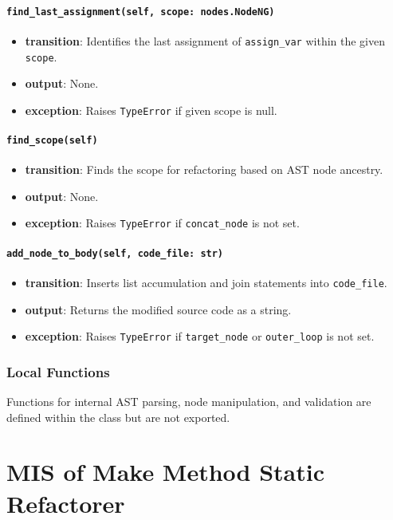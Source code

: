 \documentclass[12pt, titlepage]{article}
\begin{document}
\paragraph{\texttt{find\_last\_assignment(self, scope: nodes.NodeNG)}}
\begin{itemize}
  \item \textbf{transition}: Identifies the last assignment of \texttt{assign\_var} within the given \texttt{scope}.
  \item \textbf{output}: None.
  \item \textbf{exception}: Raises \texttt{TypeError} if given scope is null.
\end{itemize}

\paragraph{\texttt{find\_scope(self)}}
\begin{itemize}
  \item \textbf{transition}: Finds the scope for refactoring based on AST node ancestry.
  \item \textbf{output}: None.
  \item \textbf{exception}: Raises \texttt{TypeError} if \texttt{concat\_node} is not set.
\end{itemize}

\paragraph{\texttt{add\_node\_to\_body(self, code\_file: str)}}
\begin{itemize}
  \item \textbf{transition}: Inserts list accumulation and join statements into \texttt{code\_file}.
  \item \textbf{output}: Returns the modified source code as a string.
  \item \textbf{exception}: Raises \texttt{TypeError} if \texttt{target\_node} or \texttt{outer\_loop} is not set.
\end{itemize}

\subsubsection{Local Functions}
Functions for internal AST parsing, node manipulation, and validation are defined within the class but are not exported.
  
\newpage

\section{MIS of Make Method Static Refactorer} \label{mis:MakeStatic}
\end{document}

